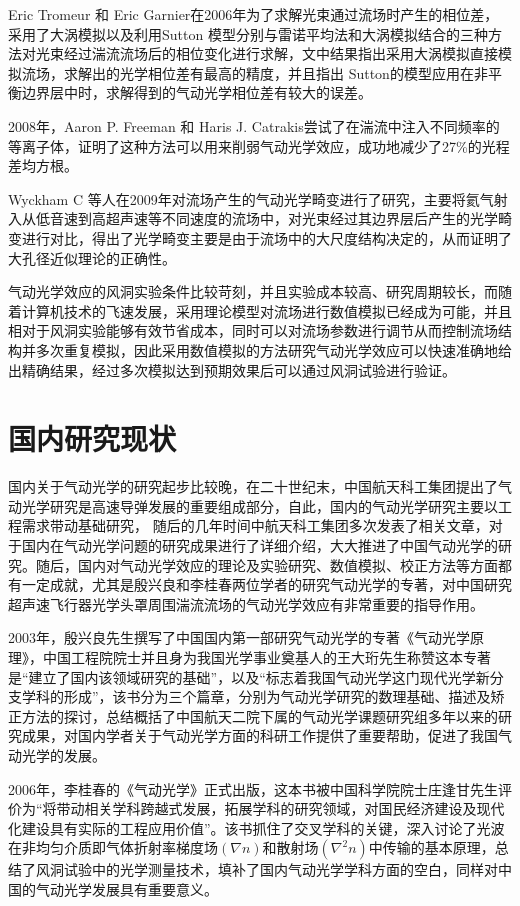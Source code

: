 Eric Tromeur 和 Eric Garnier在2006年为了求解光束通过流场时产生的相位差，采用了大涡模拟以及利用Sutton 模型分别与雷诺平均法和大涡模拟结合的三种方法对光束经过湍流流场后的相位变化进行求解\cite{tromeur2006}，文中结果指出采用大涡模拟直接模拟流场，求解出的光学相位差有最高的精度，并且指出 Sutton的模型应用在非平衡边界层中时，求解得到的气动光学相位差有较大的误差。

2008年，Aaron P. Freeman 和 Haris J. Catrakis尝试了在湍流中注入不同频率的等离子体，证明了这种方法可以用来削弱气动光学效应\cite{freeman2008}，成功地减少了27\%的光程差均方根。

Wyckham C 等人在2009年对流场产生的气动光学畸变进行了研究，主要将氦气射入从低音速到高超声速等不同速度的流场中，对光束经过其边界层后产生的光学畸变进行对比，得出了光学畸变主要是由于流场中的大尺度结构决定的，从而证明了大孔径近似理论的正确性\cite{wyckham2006}。

气动光学效应的风洞实验条件比较苛刻，并且实验成本较高、研究周期较长，而随着计算机技术的飞速发展，采用理论模型对流场进行数值模拟已经成为可能，并且相对于风洞实验能够有效节省成本，同时可以对流场参数进行调节从而控制流场结构并多次重复模拟，因此采用数值模拟的方法研究气动光学效应可以快速准确地给出精确结果，经过多次模拟达到预期效果后可以通过风洞试验进行验证。
\section{国内研究现状} 
国内关于气动光学的研究起步比较晚，在二十世纪末，中国航天科工集团提出了气动光学研究是高速导弹发展的重要组成部分，自此，国内的气动光学研究主要以工程需求带动基础研究，
随后的几年时间中航天科工集团多次发表了相关文章，对于国内在气动光学问题的研究成果进行了详细介绍，大大推进了中国气动光学的研究。随后，国内对气动光学效应的理论及实验研究、数值模拟、校正方法等方面都有一定成就，尤其是殷兴良和李桂春两位学者的研究气动光学的专著，对中国研究超声速飞行器光学头罩周围湍流流场的气动光学效应有非常重要的指导作用\cite{deng2008}。

2003年，殷兴良先生撰写了中国国内第一部研究气动光学的专著《气动光学原理》，中国工程院院士并且身为我国光学事业奠基人的王大珩先生称赞这本专著是“建立了国内该领域研究的基础”，以及“标志着我国气动光学这门现代光学新分支学科的形成”\cite{yxl2003qdgxyl}，该书分为三个篇章，分别为气动光学研究的数理基础、描述及矫正方法的探讨，总结概括了中国航天二院下属的气动光学课题研究组多年以来的研究成果，对国内学者关于气动光学方面的科研工作提供了重要帮助，促进了我国气动光学的发展。

2006年，李桂春的《气动光学》正式出版，这本书被中国科学院院士庄逢甘先生评价为“将带动相关学科跨越式发展，拓展学科的研究领域，对国民经济建设及现代化建设具有实际的工程应用价值”\cite{liguichun2006}。该书抓住了交叉学科的关键，深入讨论了光波在非均匀介质即气体折射率梯度场$(\nabla n)$和散射场$(\nabla^2 n)$中传输的基本原理，总结了风洞试验中的光学测量技术，填补了国内气动光学学科方面的空白，同样对中国的气动光学发展具有重要意义。

